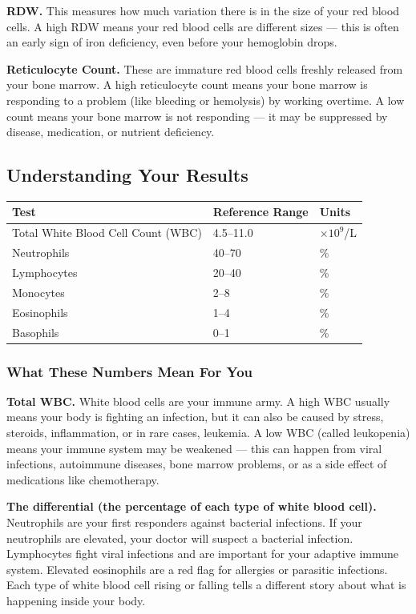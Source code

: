 \textbf{RDW.} This measures how much variation there is in the size of your red blood cells. A high RDW means your red blood cells are different sizes --- this is often an early sign of iron deficiency, even before your hemoglobin drops.

\textbf{Reticulocyte Count.} These are immature red blood cells freshly released from your bone marrow. A high reticulocyte count means your bone marrow is responding to a problem (like bleeding or hemolysis) by working overtime. A low count means your bone marrow is not responding --- it may be suppressed by disease, medication, or nutrient deficiency.

\subsection{Understanding Your Results}

\begin{longtable}{@{}lll@{}}
\toprule
\textbf{Test} & \textbf{Reference Range} & \textbf{Units} \\
\midrule
Total White Blood Cell Count (WBC) & 4.5--11.0 & $\times 10^9$/L \\
Neutrophils & 40--70 & \% \\
Lymphocytes & 20--40 & \% \\
Monocytes & 2--8 & \% \\
Eosinophils & 1--4 & \% \\
Basophils & 0--1 & \% \\
\bottomrule
\end{longtable}

\subsubsection{What These Numbers Mean For You}

\textbf{Total WBC.} White blood cells are your immune army. A high WBC usually means your body is fighting an infection, but it can also be caused by stress, steroids, inflammation, or in rare cases, leukemia. A low WBC (called leukopenia) means your immune system may be weakened --- this can happen from viral infections, autoimmune diseases, bone marrow problems, or as a side effect of medications like chemotherapy.

\textbf{The differential (the percentage of each type of white blood cell).} Neutrophils are your first responders against bacterial infections. If your neutrophils are elevated, your doctor will suspect a bacterial infection. Lymphocytes fight viral infections and are important for your adaptive immune system. Elevated eosinophils are a red flag for allergies or parasitic infections. Each type of white blood cell rising or falling tells a different story about what is happening inside your body.

